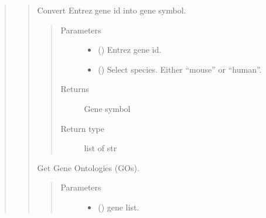 \documentclass[letterpaper,10pt,english]{sphinxmanual}
\begin{document}
\begin{quote}
\begin{quote}
\begin{fulllineitems}
\begin{quote}
\begin{description}
\end{description}\end{quote}

\end{fulllineitems}


\begin{fulllineitems}
\label{\detokenize{modules/celloracle.go_analysis:celloracle.go_analysis.geneID2Symbol}}
Convert Entrez gene id into gene symbol.
\begin{quote}\begin{description}
\item[{Parameters}] \leavevmode\begin{itemize}
\item {} 
 () \textendash{} Entrez gene id.

\item {} 
 () \textendash{} Select species. Either “mouse” or “human”.

\end{itemize}

\item[{Returns}] \leavevmode
Gene symbol

\item[{Return type}] \leavevmode
list of str

\end{description}\end{quote}

\end{fulllineitems}


\begin{fulllineitems}
\label{\detokenize{modules/celloracle.go_analysis:celloracle.go_analysis.get_GO}}
Get Gene Ontologies (GOs).
\begin{quote}\begin{description}
\item[{Parameters}] \leavevmode\begin{itemize}
\item {} 
 () \textendash{} gene list.


\end{itemize}
\end{description}
\end{quote}
\end{fulllineitems}
\end{quote}
\end{quote}
\end{document}
